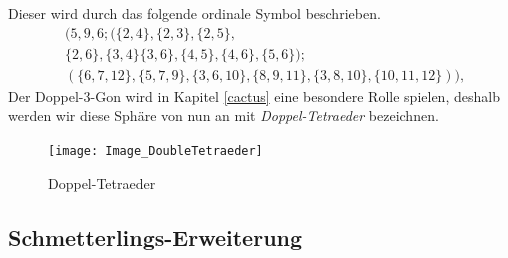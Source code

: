 \documentclass[12pt,titlepage,twoside,cleardoublepage]{article}
\theoremstyle{nummermitklammern}
\numberwithin{equation}{section}
\begin{document}
 Dieser wird durch das folgende ordinale Symbol beschrieben.
 \begin{align*}
 &(5,9,6;(\{2,4\},\{2,3\},\{2,5\},\\
 &\{2,6\},\{3,4\}\{3,6\},\{4,5\},\{4,6\},\{5,6\});\\
 &(\{6,7,12\},\{5,7,9\},\{3,6,10\},\{8,9,11\},\{3,8,10\},\{10,11,12\})),
 \end{align*}
 Der Doppel-3-Gon wird in Kapitel \ref{cactus} eine besondere Rolle spielen, deshalb werden wir diese Sphäre von nun an mit \emph{Doppel-Tetraeder} bezeichnen.
 \begin{figure}[H]
\begin{center}
\texttt{[image: Image\_DoubleTetraeder]}
\end{center}
\caption{Doppel-Tetraeder}
\end{figure}
 \subsection{Schmetterlings-Erweiterung}
\end{document}
